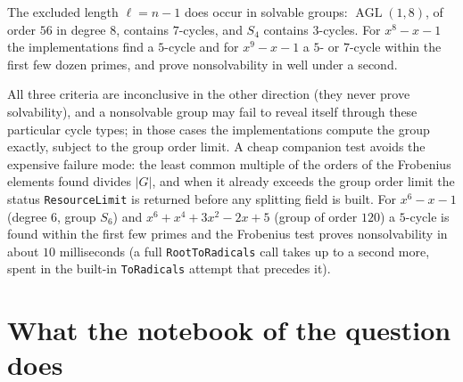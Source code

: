 \documentclass[11pt,a4paper]{article}
\theoremstyle{definition}
\theoremstyle{remark}
\newcommand{\AGL}{\operatorname{AGL}}
\newcommand{\code}[1]{\texttt{#1}}
\newcommand{\ToRadicals}{\code{ToRadicals}}
\begin{document}
The excluded length $\ell=n-1$ does occur in solvable groups: $\AGL(1,8)$, of order $56$
in degree $8$, contains $7$-cycles, and $S_4$ contains $3$-cycles.  For $x^8-x-1$ the
implementations find a $5$-cycle and for $x^9-x-1$ a $5$- or $7$-cycle within the first
few dozen primes, and prove nonsolvability in well under a second.

All three criteria are inconclusive in the other direction (they never prove
solvability), and a nonsolvable group may fail to reveal itself through these particular
cycle types; in those cases the implementations compute the group exactly, subject to the
group order limit.  A cheap companion test avoids the expensive failure mode: the least
common multiple of the orders of the Frobenius elements found divides $|G|$, and when it
already exceeds the group order limit the status \code{ResourceLimit} is returned before
any splitting field is built.  For
$x^6-x-1$ (degree $6$, group $S_6$) and $x^6+x^4+3x^2-2x+5$ (group of order $120$) a
$5$-cycle is found within the first few primes and the Frobenius test proves
nonsolvability in about $10$ milliseconds (a full \code{RootToRadicals} call takes up to
a second more, spent in the built-in \ToRadicals{} attempt that precedes it).

\section{What the notebook of the question does}\label{sec:notebook}
\end{document}
